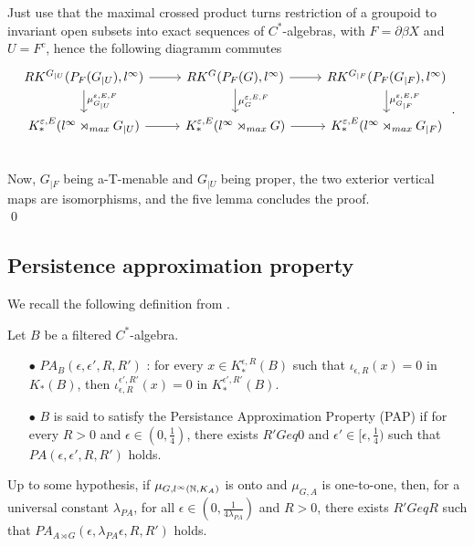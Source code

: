 \begin{dem}
Just use that the maximal crossed product turns restriction of a groupoid to invariant open subsets into exact sequences of $C^*$-algebras, with $F=\partial\beta X$ and $U= F^c$, hence the following diagramm commutes
\[\begin{tikzcd}
RK^{G_{|U}}(P_F(G_{|U}),l^\infty)\arrow{r}\arrow{d}{\mu_{G_{|U}}^{\varepsilon,E,F}} & RK^G(P_F(G),l^\infty)\arrow{r}\arrow{d}{\mu_{G}^{\varepsilon,E,F}}  & RK^{G_{|F}}(P_F(G_{|F}),l^\infty)\arrow{d}{\mu_{G_{|F}}^{\varepsilon,E,F}}  \\
K_*^{\varepsilon,E}(l^\infty \rtimes_{max} G_{|U}) \arrow{r} & K_*^{\varepsilon,E}(l^\infty \rtimes_{max} G) \arrow{r} & K_*^{\varepsilon,E}(l^\infty \rtimes_{max} G_{|F}) \\
\end{tikzcd}.\]
Now, $G_{|F}$ being a-T-menable and $G_{|U}$ being proper, the two exterior vertical maps are isomorphisms, and the five lemma concludes the proof.\\
\qed
\end{dem}

\subsection{Persistence approximation property}

We recall the following definition from \cite{OY3}.

\begin{definition}
Let $B$ be a filtered $C^*$-algebra. 
\begin{itemize}
\item[$\bullet$] $PA_B(\epsilon,\epsilon',R,R')$ : for every $x\in K_*^{\epsilon,R}(B)$ such that $\iota_{\epsilon,R}(x)=0$ in $K_*(B)$, then $\iota_{\epsilon,R}^{\epsilon',R'}(x)=0$ in $K_*^{\epsilon',R'}(B)$.
\item[$\bullet$] $B$ is said to satisfy the Persistance Approximation Property (PAP) if for every $R>0$ and $\epsilon\in (0,\frac{1}{4})$, there exists $R'Geq 0 $ and $\epsilon'\in [\epsilon,\frac{1}{4})$ such that $PA(\epsilon,\epsilon',R,R')$ holds.
\end{itemize}
\end{definition}

\begin{thm} 
Up to some hypothesis, if $\mu_{G,l^\infty(\mathbb N, K_A)}$ is onto and $\mu_{G,A}$ is one-to-one, then, for a universal constant $\lambda_{PA}$, for all $\epsilon \in(0,\frac{1}{4\lambda_{PA}})$ and $R>0$, there exists $R'Geq R$ such that $PA_{A\rtimes G}(\epsilon,\lambda_{PA}\epsilon,R,R')$ holds.
\end{thm}

